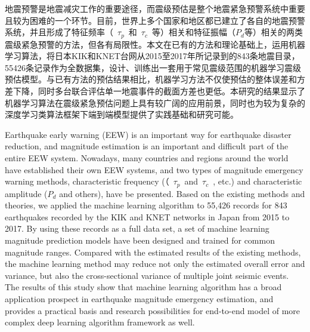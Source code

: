 
\begin{cabstract}
\indent 地震预警是地震减灾工作的重要途径，而震级预估是整个地震紧急预警系统中重要且较为困难的一个环节。目前，世界上多个国家和地区都已建立了各自的地震预警系统，并且形成了特征频率（~$\tau_{p}$~和~$\tau_{c}$~等）相关和特征振幅（$P_{d}$等）相关的两类震级紧急预警的方法，但各有局限性。本文在已有的方法和理论基础上，运用机器学习算法，将日本KIK和KNET台网从2015至2017年所记录到的843条地震目录，55426条记录作为全数据集，设计、训练出一套用于常见震级范围的机器学习震级预估模型。与已有方法的预估结果相比，机器学习方法不仅使预估的整体误差和方差下降，同时多台联合评估单一地震事件的截面方差也更低。本研究的结果显示了机器学习算法在震级紧急预估问题上具有较广阔的应用前景，同时也为较为复杂的深度学习类算法框架下端到端模型提供了实践基础和研究可能。
\end{cabstract}

\begin{eabstract}
\indent Earthquake early warning (EEW) is an important way for earthquake disaster reduction, and magnitude estimation is an important and difficult part of the entire EEW system. Nowadays, many countries and regions around the world have established their own EEW systems, and two types of magnitude emergency warning methods, characteristic frequency (（~$\tau_{p}$~and~$\tau_{c}$~, etc.) and characteristic amplitude ($P_{d}$ and others), have be presented. Based on the existing methods and theories, we applied the machine learning algorithm to 55,426 records for 843 earthquakes recorded by the KIK and KNET networks in Japan from 2015 to 2017. By using these records as a full data set, a set of machine learning magnitude prediction models have been designed and trained for common magnitude ranges. Compared with the estimated results of the existing methods, the machine learning method may reduce not only the estimated overall error and variance, but also the cross-sectional variance of multiple joint seismic events. The results of this study show that machine learning algorithm has a broad application prospect in earthquake magnitude emergency estimation, and provides a practical basis and research possibilities for end-to-end model of more complex deep learning algorithm framework as well.



\end{eabstract}

